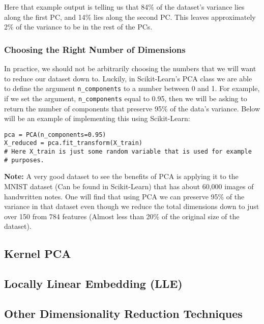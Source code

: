 \noindent
Here that example output is telling us that 84\% of the dataset's variance lies along the first PC, and 14\% lies along
the second PC. This leaves approximately 2\% of the variance to be in the rest of the PCs.

\subsubsection*{Choosing the Right Number of Dimensions}

In practice, we should not be arbitrarily choosing the numbers that we will want to reduce our dataset down to. Luckily,
in Scikit-Learn's PCA class we are able to define the argument \texttt{n_components} to a number between
0 and 1. For example, if we set the argument, \texttt{n_components} equal to 0.95, then we will be asking
to return the number of components that preserve 95\% of the data's variance. Below will be an example of implementing
this using Scikit-Learn:

\begin{verbatim}
pca = PCA(n_components=0.95)
X_reduced = pca.fit_transform(X_train)
# Here X_train is just some random variable that is used for example 
# purposes.
\end{verbatim}

\noindent
\textbf{Note:} A very good dataset to see the benefits of PCA is applying it to the MNIST dataset (Can be found in Scikit-Learn)
that has about 60,000 images of handwritten notes. One will find that using PCA we can preserve 95\% of the variance in
that dataset even though we reduce the total dimensions down to just over 150 from 784 features (Almost less than 
20\% of the original size of the dataset). 

\subsection{Kernel PCA}

\subsection{Locally Linear Embedding (LLE)}

\subsection{Other Dimensionality Reduction Techniques}